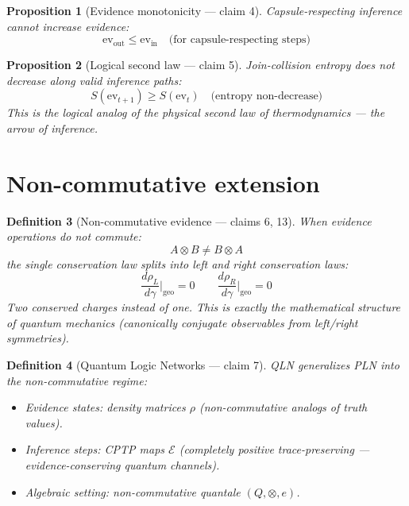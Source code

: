 \documentclass[11pt,a4paper]{article}
\newtheorem{definition}{Definition}[section]
\newtheorem{proposition}[definition]{Proposition}
\begin{document}
\begin{proposition}[Evidence monotonicity --- claim 4]
\label{prop:monotone}
Capsule-respecting inference cannot increase evidence:
\[
  \text{ev}_{\text{out}} \leq \text{ev}_{\text{in}} \quad
  \text{(for capsule-respecting steps)}
\]
\end{proposition}

\begin{proposition}[Logical second law --- claim 5]
\label{prop:entropy}
Join-collision entropy does not decrease along valid inference paths:
\[
  S(\text{ev}_{t+1}) \geq S(\text{ev}_t) \quad
  \text{(entropy non-decrease)}
\]
This is the logical analog of the physical second law of
thermodynamics --- the arrow of inference.
\end{proposition}

\section{Non-commutative extension}

\begin{definition}[Non-commutative evidence --- claims 6, 13]
When evidence operations do not commute:
\[
  A \otimes B \neq B \otimes A
\]
the single conservation law splits into left and right conservation
laws:
\[
  \frac{d\rho_L}{d\gamma}\bigg|_{\text{geo}} = 0 \qquad
  \frac{d\rho_R}{d\gamma}\bigg|_{\text{geo}} = 0
\]
Two conserved charges instead of one. This is exactly the
mathematical structure of quantum mechanics (canonically conjugate
observables from left/right symmetries).
\end{definition}

\begin{definition}[Quantum Logic Networks --- claim 7]
\emph{QLN} generalizes PLN into the non-commutative regime:
\begin{itemize}
  \item Evidence states: density matrices $\rho$ (non-commutative
    analogs of truth values).
  \item Inference steps: CPTP maps $\mathcal{E}$ (completely positive
    trace-preserving --- evidence-conserving quantum channels).
  \item Algebraic setting: non-commutative quantale $(Q, \otimes, e)$.
\end{itemize}
\end{definition}


\end{document}
